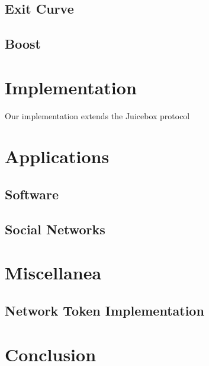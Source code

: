 \documentclass{article}
\begin{document}
\subsection{Exit Curve}

\subsection{Boost}

\section{Implementation}

Our implementation extends the Juicebox protocol 

\section{Applications}

\subsection{Software}

\subsection{Social Networks}

\section{Miscellanea}

\subsection{Network Token Implementation}

\section{Conclusion}



\end{document}
